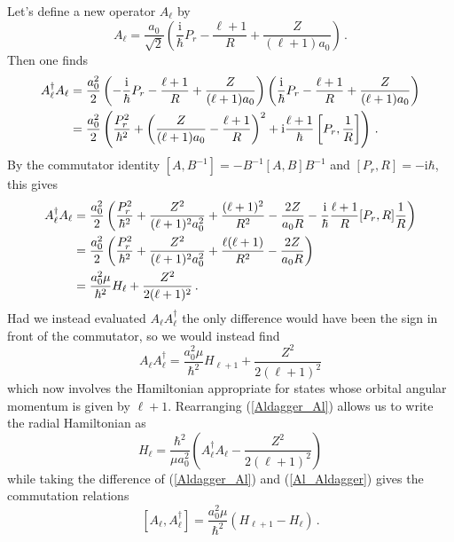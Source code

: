 \documentclass{article}
\theoremstyle{plain}\theoremheaderfont{\normalfont\itshape}\theorembodyfont{\rmfamily}\theoremseparator{.}\newtheorem*{rem}{Remark}\newtheorem*{ex}{Example}\newtheorem*{proof}{Proof}\newtheorem*{altp}{Alternative proof}
\theoremstyle{plain}\theoremheaderfont{\normalfont\bfseries}\theorembodyfont{\rmfamily}\theoremseparator{.}\newtheorem{thm}{Theorem}[section]\newtheorem{lem}[thm]{Lemma}\newtheorem{prop}[thm]{Proposition}\newtheorem*{cor}{Corollary}\newtheorem{defn}[thm]{Definition}\newtheorem{clm}[thm]{Claim}\newtheorem{clminproof}{Claim}
\theoremstyle{break}\theoremheaderfont{\normalfont\itshape}\theorembodyfont{\rmfamily}\theoremseparator{.\medskip}\newtheorem*{proofskip}{Proof}\newtheorem*{exs}{Examples}\newtheorem*{rems}{Remarks}
\theoremstyle{break}\theoremheaderfont{\normalfont\bfseries}\theorembodyfont{\rmfamily}\theoremseparator{.\medskip}\newtheorem{lemskip}[thm]{Lemma}\newtheorem{defnskip}[thm]{Definition}\newtheorem{propskip}[thm]{Proposition}\newtheorem{thmskip}[thm]{Theorem}
\numberwithin{equation}{section}
\newcommand{\ii}{\mathrm{i}}
\begin{document}
    Let's define a new operator \(A_\ell\) by
    \begin{equation}
        A_\ell=\frac{a_0}{\sqrt{2}}\left(\frac{\ii}{\hbar}P_r-\frac{\ell+1}{R}+\frac{Z}{(\ell+1)a_0}\right)\,.
    \end{equation}
    Then one finds
    \begin{align}
        A_\ell^\dagger A_\ell&=\frac{a_0^2}{2}\left(-\frac{\ii}{\hbar}P_r-\frac{\ell+1}{R}+\frac{Z}{(\ell+1)a_0}\right)\left(\frac{\ii}{\hbar}P_r-\frac{\ell+1}{R}+\frac{Z}{(\ell+1)a_0}\right)\notag\\
        &=\frac{a_0^2}{2}\left(\frac{P_r^2}{\hbar^2}+\left(\frac{Z}{(\ell+1)a_0}-\frac{\ell+1}{R}\right)^2+\ii\frac{\ell+1}{\hbar}\left[P_r,\frac{1}{R}\right]\right)\,.
    \end{align}
    By the commutator identity \([A,B^{-1}]=-B^{-1}[A,B]B^{-1}\) and \([P_r,R]=-\ii\hbar\), this gives
    \begin{align}
        A_\ell^\dagger A_\ell&=\frac{a_0^2}{2}\left(\frac{P_r^2}{\hbar^2}+\frac{Z^2}{(\ell+1)^2a_0^2}+\frac{(\ell+1)^2}{R^2}-\frac{2Z}{a_0R}-\frac{\ii}{\hbar}\frac{\ell+1}{R}[P_r,R]\frac{1}{R}\right)\notag\\
        &=\frac{a_0^2}{2}\left(\frac{P_r^2}{\hbar^2}+\frac{Z^2}{(\ell+1)^2a_0^2}+\frac{\ell(\ell+1)}{R^2}-\frac{2Z}{a_0R}\right)\notag\\
        &=\frac{a_0^2\mu}{\hbar^2}H_\ell+\frac{Z^2}{2(\ell+1)^2}\,.\label{Aldagger_Al}
    \end{align}
    Had we instead evaluated \(A_\ell A_\ell^\dagger\) the only difference would have been the sign in front of the commutator, so we would instead find
    \begin{equation}\label{Al_Aldagger}
        A_\ell A_\ell^\dagger=\frac{a_0^2\mu}{\hbar^2}H_{\ell+1}+\frac{Z^2}{2(\ell+1)^2}
    \end{equation}
    which now involves the Hamiltonian appropriate for states whose orbital angular momentum is given by \(\ell+1\). Rearranging (\ref{Aldagger_Al}) allows us to write the radial Hamiltonian as
    \begin{equation}
        H_\ell=\frac{\hbar^2}{\mu a_0^2}\left(A_\ell^\dagger A_\ell-\frac{Z^2}{2(\ell+1)^2}\right)
    \end{equation}
    while taking the difference of (\ref{Aldagger_Al}) and (\ref{Al_Aldagger}) gives the commutation relations
    \begin{equation}
        \left[A_\ell,A_\ell^\dagger\right]=\frac{a_0^2\mu}{\hbar^2}(H_{\ell+1}-H_\ell)\,.
    \end{equation}
\end{document}
